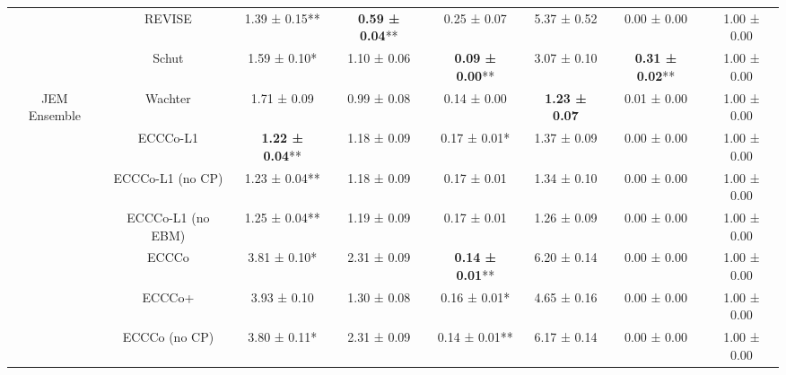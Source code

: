 \begin{table}
{\begin{tabular}[t]{cccccccc}
 & REVISE & 1.39 ± 0.15** & \textbf{0.59 ± 0.04}** & 0.25 ± 0.07\hphantom{*}\hphantom{*} & 5.37 ± 0.52\hphantom{*}\hphantom{*} & 0.00 ± 0.00\hphantom{*}\hphantom{*} & 1.00 ± 0.00\hphantom{*}\hphantom{*}\\

 & Schut & 1.59 ± 0.10*\hphantom{*} & 1.10 ± 0.06\hphantom{*}\hphantom{*} & \textbf{0.09 ± 0.00}** & 3.07 ± 0.10\hphantom{*}\hphantom{*} & \textbf{0.31 ± 0.02}** & 1.00 ± 0.00\hphantom{*}\hphantom{*}\\

\multirow[t]{-10}{*}{\centering\arraybackslash JEM Ensemble} & Wachter & 1.71 ± 0.09\hphantom{*}\hphantom{*} & 0.99 ± 0.08\hphantom{*}\hphantom{*} & 0.14 ± 0.00\hphantom{*}\hphantom{*} & \textbf{1.23 ± 0.07}\hphantom{*}\hphantom{*} & 0.01 ± 0.00\hphantom{*}\hphantom{*} & 1.00 ± 0.00\hphantom{*}\hphantom{*}\\
\cmidrule{1-8}
 & ECCCo-L1 & \textbf{1.22 ± 0.04}** & 1.18 ± 0.09\hphantom{*}\hphantom{*} & 0.17 ± 0.01*\hphantom{*} & 1.37 ± 0.09\hphantom{*}\hphantom{*} & 0.00 ± 0.00\hphantom{*}\hphantom{*} & 1.00 ± 0.00\hphantom{*}\hphantom{*}\\

 & ECCCo-L1 (no CP) & 1.23 ± 0.04** & 1.18 ± 0.09\hphantom{*}\hphantom{*} & 0.17 ± 0.01\hphantom{*}\hphantom{*} & 1.34 ± 0.10\hphantom{*}\hphantom{*} & 0.00 ± 0.00\hphantom{*}\hphantom{*} & 1.00 ± 0.00\hphantom{*}\hphantom{*}\\

 & ECCCo-L1 (no EBM) & 1.25 ± 0.04** & 1.19 ± 0.09\hphantom{*}\hphantom{*} & 0.17 ± 0.01\hphantom{*}\hphantom{*} & 1.26 ± 0.09\hphantom{*}\hphantom{*} & 0.00 ± 0.00\hphantom{*}\hphantom{*} & 1.00 ± 0.00\hphantom{*}\hphantom{*}\\

 & ECCCo & 3.81 ± 0.10*\hphantom{*} & 2.31 ± 0.09\hphantom{*}\hphantom{*} & \textbf{0.14 ± 0.01}** & 6.20 ± 0.14\hphantom{*}\hphantom{*} & 0.00 ± 0.00\hphantom{*}\hphantom{*} & 1.00 ± 0.00\hphantom{*}\hphantom{*}\\

 & ECCCo+ & 3.93 ± 0.10\hphantom{*}\hphantom{*} & 1.30 ± 0.08\hphantom{*}\hphantom{*} & 0.16 ± 0.01*\hphantom{*} & 4.65 ± 0.16\hphantom{*}\hphantom{*} & 0.00 ± 0.00\hphantom{*}\hphantom{*} & 1.00 ± 0.00\hphantom{*}\hphantom{*}\\

 & ECCCo (no CP) & 3.80 ± 0.11*\hphantom{*} & 2.31 ± 0.09\hphantom{*}\hphantom{*} & 0.14 ± 0.01** & 6.17 ± 0.14\hphantom{*}\hphantom{*} & 0.00 ± 0.00\hphantom{*}\hphantom{*} & 1.00 ± 0.00\hphantom{*}\hphantom{*}\\


\end{tabular}}
\end{table}
